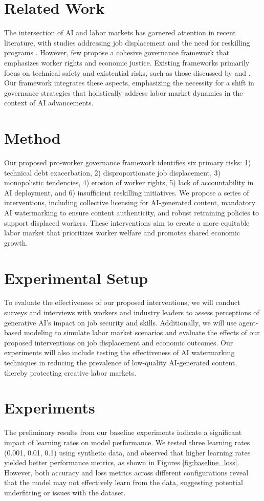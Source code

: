 \documentclass{article} %
\begin{document}
\section{Related Work}
The intersection of AI and labor markets has garnered attention in recent literature, with studies addressing job displacement and the need for reskilling programs \citep{maria2025artificialia, olaniyi2024dynamicsot}. However, few propose a cohesive governance framework that emphasizes worker rights and economic justice. Existing frameworks primarily focus on technical safety and existential risks, such as those discussed by \citep{hazra2025aiss} and \citep{kulveit2025gradualds}. Our framework integrates these aspects, emphasizing the necessity for a shift in governance strategies that holistically address labor market dynamics in the context of AI advancements.

\section{Method}
Our proposed pro-worker governance framework identifies six primary risks: 1) technical debt exacerbation, 2) disproportionate job displacement, 3) monopolistic tendencies, 4) erosion of worker rights, 5) lack of accountability in AI deployment, and 6) insufficient reskilling initiatives. We propose a series of interventions, including collective licensing for AI-generated content, mandatory AI watermarking to ensure content authenticity, and robust retraining policies to support displaced workers. These interventions aim to create a more equitable labor market that prioritizes worker welfare and promotes shared economic growth.

\section{Experimental Setup}
To evaluate the effectiveness of our proposed interventions, we will conduct surveys and interviews with workers and industry leaders to assess perceptions of generative AI's impact on job security and skills. Additionally, we will use agent-based modeling to simulate labor market scenarios and evaluate the effects of our proposed interventions on job displacement and economic outcomes. Our experiments will also include testing the effectiveness of AI watermarking techniques in reducing the prevalence of low-quality AI-generated content, thereby protecting creative labor markets.

\section{Experiments}
The preliminary results from our baseline experiments indicate a significant impact of learning rates on model performance. We tested three learning rates (0.001, 0.01, 0.1) using synthetic data, and observed that higher learning rates yielded better performance metrics, as shown in Figures \ref{fig:baseline_loss}. However, both accuracy and loss metrics across different configurations reveal that the model may not effectively learn from the data, suggesting potential underfitting or issues with the dataset.
\end{document}

